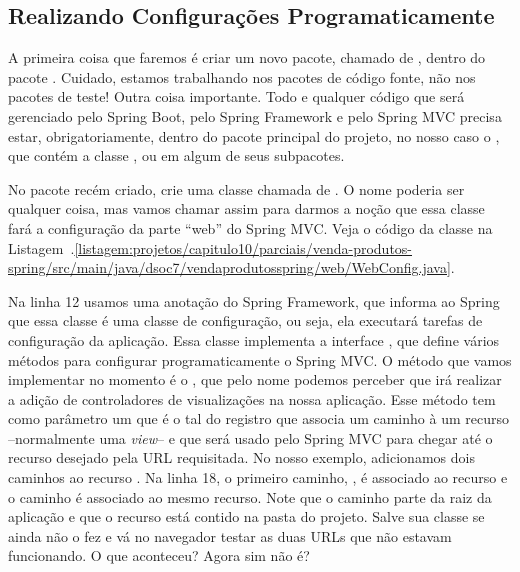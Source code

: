 \subsection{Realizando Configurações Programaticamente}

A primeira coisa que faremos é criar um novo pacote, chamado de , dentro do pacote . Cuidado, estamos trabalhando nos pacotes de código fonte, não nos pacotes de teste! Outra coisa importante. Todo e qualquer código que será gerenciado pelo Spring Boot, pelo Spring Framework e pelo Spring MVC precisa estar, obrigatoriamente, dentro do pacote principal do projeto, no nosso caso o , que contém a classe , ou em algum de seus subpacotes.

No pacote  recém criado, crie uma classe chamada de . O nome poderia ser qualquer coisa, mas vamos chamar assim para darmos a noção que essa classe fará a configuração da parte ``web'' do Spring MVC. Veja o código da classe na Listagem~\thechapter.\ref{listagem:projetos/capitulo10/parciais/venda-produtos-spring/src/main/java/dsoc7/vendaprodutosspring/web/WebConfig.java}.


Na linha 12 usamos uma anotação  do Spring Framework, que informa ao Spring que essa classe é uma classe de configuração, ou seja, ela executará tarefas de configuração da aplicação. Essa classe implementa a interface , que define vários métodos para configurar programaticamente o Spring MVC. O método que vamos implementar no momento é o , que pelo nome podemos perceber que irá realizar a adição de controladores de visualizações na nossa aplicação. Esse método tem como parâmetro um  que é o tal do registro que associa um caminho à um recurso --normalmente uma \textit{view}-- e que será usado pelo Spring MVC para chegar até o recurso desejado pela URL requisitada. No nosso exemplo, adicionamos dois caminhos ao recurso . Na linha 18, o primeiro caminho, , é associado ao recurso  e o caminho  é associado ao mesmo recurso. Note que o caminho parte da raiz da aplicação e que o recurso está contido na pasta  do projeto. Salve sua classe se ainda não o fez e vá no navegador testar as duas URLs que não estavam funcionando. O que aconteceu? Agora sim não é?


